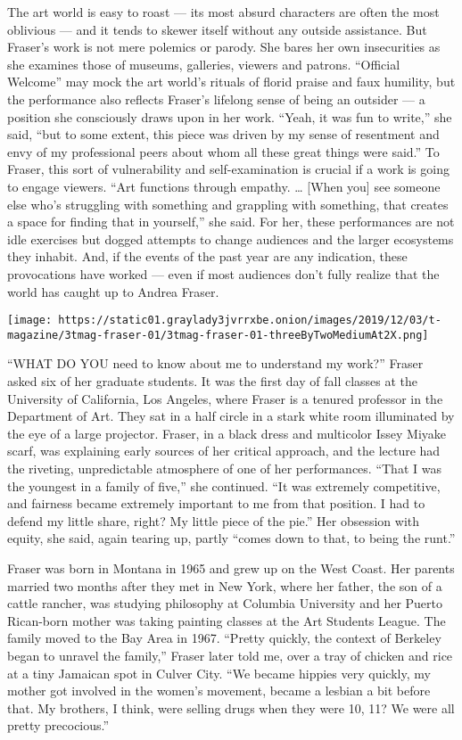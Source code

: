 The art world is easy to roast --- its most absurd characters are often
the most oblivious --- and it tends to skewer itself without any outside
assistance. But Fraser's work is not mere polemics or parody. She bares
her own insecurities as she examines those of museums, galleries,
viewers and patrons. ``Official Welcome'' may mock the art world's
rituals of florid praise and faux humility, but the performance also
reflects Fraser's lifelong sense of being an outsider --- a position she
consciously draws upon in her work. ``Yeah, it was fun to write,'' she
said, ``but to some extent, this piece was driven by my sense of
resentment and envy of my professional peers about whom all these great
things were said.'' To Fraser, this sort of vulnerability and
self-examination is crucial if a work is going to engage viewers. ``Art
functions through empathy. \ldots{} {[}When you{]} see someone else
who's struggling with something and grappling with something, that
creates a space for finding that in yourself,'' she said. For her, these
performances are not idle exercises but dogged attempts to change
audiences and the larger ecosystems they inhabit. And, if the events of
the past year are any indication, these provocations have worked ---
even if most audiences don't fully realize that the world has caught up
to Andrea Fraser.

\texttt{[image: https://static01.graylady3jvrrxbe.onion/images/2019/12/03/t-magazine/3tmag-fraser-01/3tmag-fraser-01-threeByTwoMediumAt2X.png]}

``WHAT DO YOU need to know about me to understand my work?'' Fraser
asked six of her graduate students. It was the first day of fall classes
at the University of California, Los Angeles, where Fraser is a tenured
professor in the Department of Art. They sat in a half circle in a stark
white room illuminated by the eye of a large projector. Fraser, in a
black dress and multicolor Issey Miyake scarf, was explaining early
sources of her critical approach, and the lecture had the riveting,
unpredictable atmosphere of one of her performances. ``That I was the
youngest in a family of five,'' she continued. ``It was extremely
competitive, and fairness became extremely important to me from that
position. I had to defend my little share, right? My little piece of the
pie.'' Her obsession with equity, she said, again tearing up, partly
``comes down to that, to being the runt.''

Fraser was born in Montana in 1965 and grew up on the West Coast. Her
parents married two months after they met in New York, where her father,
the son of a cattle rancher, was studying philosophy at Columbia
University and her Puerto Rican-born mother was taking painting classes
at the Art Students League. The family moved to the Bay Area in 1967.
``Pretty quickly, the context of Berkeley began to unravel the family,''
Fraser later told me, over a tray of chicken and rice at a tiny Jamaican
spot in Culver City. ``We became hippies very quickly, my mother got
involved in the women's movement, became a lesbian a bit before that. My
brothers, I think, were selling drugs when they were 10, 11? We were all
pretty precocious.''

